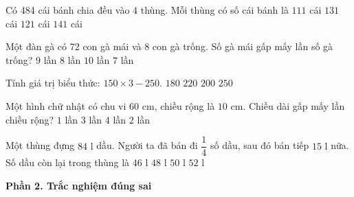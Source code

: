 \begin{ex} %
Có 484 cái bánh chia đều vào 4 thùng. Mỗi thùng có số cái bánh là
\choice
{$111$ cái}
{$131$ cái}
{\True $121$ cái}
{$141$ cái}
\end{ex}

\begin{ex} %
Một đàn gà có 72 con gà mái và 8 con gà trống. Số gà mái gấp mấy lần số gà trống?
\choice
{\True $9$ lần}
{$8$ lần}
{$10$ lần}
{$7$ lần}
\end{ex}

\begin{ex} %
Tính giá trị biểu thức: $150 \times 3 - 250$.
\choice
{$180$}
{$220$}
{\True $200$}
{$250$}
\end{ex}

\begin{ex} %
Một hình chữ nhật có chu vi $60\text{ cm}$, chiều rộng là $10\text{ cm}$. Chiều dài gấp mấy lần chiều rộng?
\choice
{$1$ lần}
{$3$ lần}
{$4$ lần}
{\True $2$ lần}
\end{ex}

\begin{ex} %
Một thùng đựng $84\text{ l}$ dầu. Người ta đã bán đi $\dfrac{1}{4}$ số dầu, sau đó bán tiếp $15\text{ l}$ nữa. Số dầu còn lại trong thùng là
\choice
{$46\text{ l}$}
{\True $48\text{ l}$}
{$50\text{ l}$}
{$52\text{ l}$}
\end{ex}

\textbf{Phần 2. Trắc nghiệm đúng sai}


